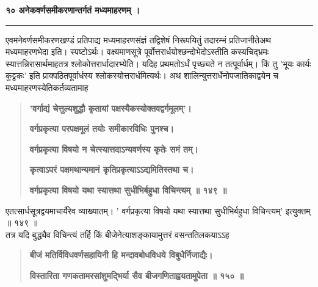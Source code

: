\documentclass[11pt, openany]{book}
\begin{document}
\onehalfspacing
\begin{center}
\textbf{१० अनेकवर्णसमीकरणान्तर्गतं मध्यमाहरणम् ।}

\rule{0.3\linewidth}{0.5pt}
\end{center}

\begin{sloppypar}
\hangindent=0.2in \hspace{0.2in}एवमनेवर्णसमीकरणखण्डं प्रतिपाद्य मध्यमाहरणसंज्ञं तद्विशेषं निरूपयितुं तदारम्भं प्रतिजानीते\textendash अथ मध्यमाहरणभेदा इति। स्पष्टोऽर्थः। वक्ष्यमाणसूत्रे पूर्वोत्तरार्धयोश्छन्दोभेदोऽस्तीति कस्यचिद्भ्रमः स्यात्तन्निरासार्थमाह\textendash तत्र श्लोकोत्तरार्धादारभ्येति। यदिह प्रथमतोऽर्धं पृच्छ्यते न तत्पूर्वार्धम्। किं तु 'भूयः कार्यः कुट्टकः' इति प्राक्पठितपूर्वार्धस्य श्लोकस्योत्तरार्धमित्यर्थः। अथ शालिन्युत्तरार्धेनोपजातिकाद्वयेन च मध्यमाहरणस्येतिकर्तव्यतामाह\textendash

\begin{quote}
\hspace{1in}\textbf{'वर्गाद्यं चेत्तुल्यशुद्धौ कृतायां पक्षस्यैकस्योक्तवद्वर्गमूलम्'।}

\hspace{1in}\textbf{वर्गप्रकृत्या परपक्षमूलं तयोः समीकारविधिः पुनश्च।}

\hspace{1in}\textbf{वर्गप्रकृत्या विषयो न चेत्स्यात्तदाऽन्यवर्णस्य कृतेः समं तम्।}

\hspace{1in}\textbf{कृत्वाऽपरं पक्षमथान्यमानं कृतिप्रकृत्याऽऽद्यमितिस्तथा च।}

\hspace{1in}\textbf{वर्गप्रकृत्या विषयो यथा स्यात्तथा सुधीभिर्बहुधा विचिन्त्यम् ॥ १४९ ॥}
\end{quote}

\hangindent=0.2in \hspace{0.2in}एतत्सार्धसूत्रद्वयमाचार्यैरेव व्याख्यातम्। ' वर्गप्रकृत्या विषयो यथा स्यात्तथा सुधीभिर्बहुधा विचिन्त्यम्' इत्युक्तम् ॥ १४९ ॥\\

\hangindent=0.2in \hspace{0.2in}तत्र यदि बुद्ध्यैव विचिन्त्यं तर्हि किं बीजेनेत्याशङ्कायामुत्तरं वसन्ततिलकयाऽऽह\textendash

\begin{quote}
\hspace{0.5in}\textbf{बीजं मतिर्विविधवर्णसहायिनी हि मन्दावबोधविधये विबुधैर्निजाद्यैः।}

\hspace{0.5in}\textbf{विस्तारिता गणकतामरसांशुमद्भिर्या सैव बीजगणिताह्वयतामुपेता ॥ १५० ॥}
\end{quote}


\end{sloppypar}
\end{document}

